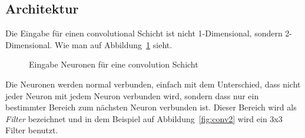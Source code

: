 \documentclass[12pt,a4paper]{report}
\begin{document}
\subsection{Architektur}
Die Eingabe für einen convolutional Schicht ist nicht 1-Dimensional, sondern 2-Dimensional.
Wie man auf Abbildung~\ref{fig:conv1} sieht.
\begin{figure}[h]
    \centering
{}
    \caption{Eingabe Neuronen für eine convolution Schicht}
    \label{fig:conv1}
\end{figure}
Die Neuronen werden normal verbunden, einfach mit dem Unterschied, dass nicht jeder Neuron mit jedem Neuron verbunden wird,
sondern dass nur ein bestimmter Bereich zum nächsten Neuron verbunden ist.
Dieser Bereich wird als \textit{Filter} bezeichnet und in dem Beispiel auf Abbildung~\ref{fig:conv2} wird ein 3x3 Filter benutzt.
\end{document}
